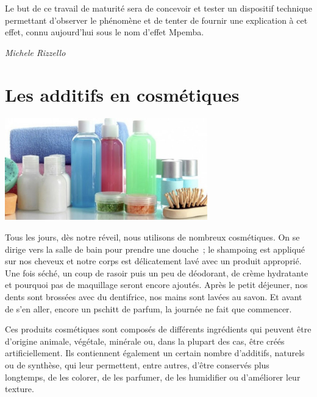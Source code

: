 \documentclass[
  10pt,
  french,
  a5paper,
  openany]{book}
\newenvironment{signature}{\begin{flushright}}{\end{flushright}}
\begin{document}
Le but de ce travail de maturité sera de concevoir et tester un dispositif technique permettant d'observer le phénomène et de tenter de fournir une explication à cet effet, connu aujourd'hui sous le nom d'effet Mpemba.

\begin{signature}
\emph{Michele Rizzello}

\end{signature}

\hypertarget{les-additifs-en-cosmuxe9tiques}{%
\chapter{Les additifs en cosmétiques}\label{les-additifs-en-cosmuxe9tiques}}

\begin{center}
\includegraphics[width=\textwidth,height=12em]{images/les-additifs-en-cosmetiques.jpg}

\end{center}

Tous les jours, dès notre réveil, nous utilisons de nombreux cosmétiques. On se dirige vers la salle de bain pour prendre une douche~; le shampoing est appliqué sur nos cheveux et notre corps est délicatement lavé avec un produit approprié. Une fois séché, un coup de rasoir puis un peu de déodorant, de crème hydratante et pourquoi pas de maquillage seront encore ajoutés. Après le petit déjeuner, nos dents sont brossées avec du dentifrice, nos mains sont lavées au savon. Et avant de s'en aller, encore un pschitt de parfum, la journée ne fait que commencer.

Ces produits cosmétiques sont composés de différents ingrédients qui peuvent être d'origine animale, végétale, minérale ou, dans la plupart des cas, être créés artificiellement. Ils contiennent également un certain nombre d'additifs, naturels ou de synthèse, qui leur permettent, entre autres, d'être conservés plus longtemps, de les colorer, de les parfumer, de les humidifier ou d'améliorer leur texture.

\clearpage
\end{document}
